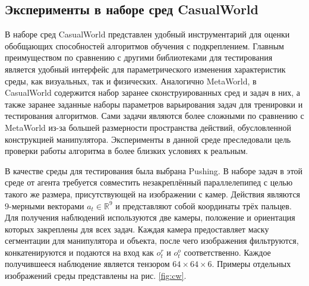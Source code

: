 \subsection{Эксперименты в наборе сред CasualWorld}
В наборе сред CasualWorld\cite{cw} представлен удобный инструментарий для оценки обобщающих способностей алгоритмов обучения с подкреплением.
Главным преимуществом по сравнению с другими библиотеками для тестирования является удобный интерфейс для параметрического изменения характеристик среды, как визуальных, так и физических.
Аналогично MetaWorld, в CasualWorld содержится набор заранее сконструированных сред и задач в них, а также заранее заданные наборы параметров варьирования задач для тренировки и тестирования алгоритмов.
Сами задачи являются более сложными по сравнению с MetaWorld из-за большей размерности пространства действий, обусловленной конструкцией манипулятора.
Эксперименты в данной среде преследовали цель проверки работы алгоритма в более близких условиях к реальным.

В качестве среды для тестирования была выбрана Pushing.
В наборе задач в этой среде от агента требуется совместить незакреплённый параллелепипед с целью такого же размера, присутствующей на изображении с камер.
Действия являются $9$-мерными векторами $a_t \in \mathbb{R}^9$ и представляют собой координаты трёх пальцев.
Для получения наблюдений используются две камеры, положение и ориентация которых закреплены для всех задач.
Каждая камера предоставляет маску сегментации для манипулятора и объекта, после чего изображения фильтруются, конкатенируются и подаются на вход как $o^r_t$ и $o^o_t$ соответственно.
Каждое получившееся наблюдение является тензором $64 \times 64 \times 6$.
Примеры отдельных изображений среды представлены на рис. \ref{fig:cw}.

